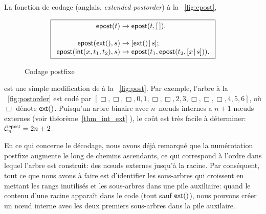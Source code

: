 La fonction de codage
(anglais, \emph{extended postorder}) à la \fig~\vref{fig:epost},
\begin{figure}[b]
\begin{equation*}
\boxed{
\begin{array}{r@{\;}c@{\;}l}
\fun{epost}(t) & \rightarrow & \fun{epost}(t,\el).\\
\\
\fun{epost}(\fun{ext}(),s) & \rightarrow
  & \cons{\fun{ext}()}{s};\\
\fun{epost}(\fun{int}(x,t_1,t_2),s) & \rightarrow
  & \fun{epost}(t_1,\fun{epost}(t_2,\cons{x}{s})).
\end{array}}
\end{equation*}
\caption{Codage postfixe\label{fig:epost}}
\end{figure}
est une simple modification de  à
la \fig~\vref{fig:post}. Par exemple, l'arbre à la
\fig~\vref{fig:postorder} est codé par \([\Box, \Box, \Box, 0, 1,
\Box, \Box, 2, 3, \Box, \Box, \Box, 4, 5, 6]\), où \(\Box\) dénote
\(\fun{ext}()\). Puisqu'un arbre binaire avec \(n\)~n{\oe}uds internes
a \(n+1\) n{\oe}uds externes (voir théorème~\ref{thm_int_ext}
), le coût est très facile à déterminer:
\(\C{\fun{epost}}{n} = 2n + 2\).

En ce qui concerne le décodage, nous avons déjà remarqué que la
numérotation postfixe augmente le long de chemins ascendants, ce qui
correspond à l'ordre dans lequel l'arbre est construit: des n{\oe}uds
externes jusqu'à la racine. Par conséquent, tout ce que nous avons à
faire est d'identifier les sous-arbres qui croissent en mettant les
rangs inutilisés et les sous-arbres dans une pile auxiliaire: quand le
contenu d'une racine apparaît dans le code (tout sauf
\(\fun{ext}()\)), nous pouvons créer un n{\oe}ud interne avec les deux
premiers sous-arbres dans la pile auxilaire.

